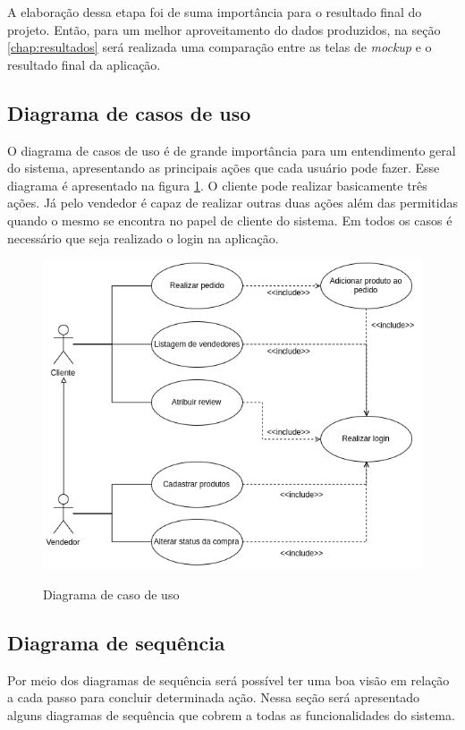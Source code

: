 A elaboração dessa etapa foi de suma importância para o resultado final do projeto. Então, para um melhor aproveitamento do dados produzidos, na seção \ref{chap:resultados} será realizada uma comparação entre as telas de \textit{mockup} e o resultado final da aplicação.

\subsection{Diagrama de casos de uso}
O diagrama de casos de uso é de grande importância para um entendimento geral do sistema, apresentando as principais ações que cada usuário pode fazer. Esse diagrama é apresentado na figura \ref{fig:use}. O cliente pode realizar basicamente três ações. Já pelo vendedor é capaz de realizar outras duas ações além das permitidas quando o mesmo se encontra no papel de cliente do sistema. Em todos os casos é necessário que seja realizado o login na aplicação.
\begin{figure}[htbp!]
  \centering
  \caption{Diagrama de caso de uso}
  \includegraphics[width=1\textwidth]{figs/caso_de_uso.png}
    \label{fig:use}
\end{figure}


\subsection{Diagrama de sequência}
Por meio dos diagramas de sequência será possível ter uma boa visão em relação a cada passo para concluir determinada ação. Nessa seção será apresentado alguns diagramas de sequência que cobrem a todas as funcionalidades do sistema.

